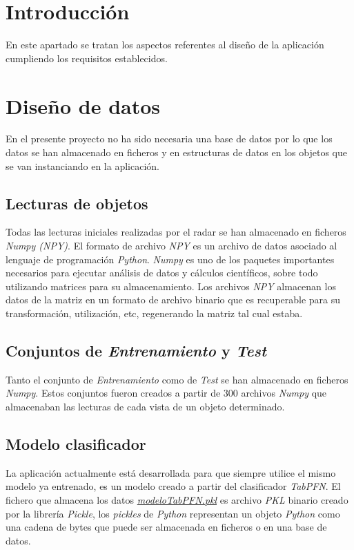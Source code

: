
\section{Introducción}

En este apartado se tratan los aspectos referentes al diseño de la aplicación cumpliendo los requisitos establecidos.

\section{Diseño de datos}

En el presente proyecto no ha sido necesaria una base de datos por lo que los datos se han almacenado en ficheros y en estructuras de datos en los objetos que se van instanciando en la aplicación.

\subsection{Lecturas de objetos}

Todas las lecturas iniciales realizadas por el radar se han almacenado en ficheros \textit{Numpy (NPY)}. El formato de archivo \textit{NPY} es un archivo de datos asociado al lenguaje de programación \textit{Python}. \textit{Numpy} es uno de los paquetes importantes necesarios para ejecutar análisis de datos y cálculos científicos, sobre todo utilizando matrices para su almacenamiento. Los archivos \textit{NPY} almacenan los datos de la matriz en un formato de archivo binario que es recuperable para su transformación, utilización, etc, regenerando la matriz tal cual estaba.

\subsection{Conjuntos de \textit{Entrenamiento} y \textit{Test}}

Tanto el conjunto de \textit{Entrenamiento} como de \textit{Test} se han almacenado en ficheros \textit{Numpy}. Estos conjuntos fueron creados a partir de 300 archivos \textit{Numpy} que almacenaban las lecturas de cada vista de un objeto determinado.

\subsection{Modelo clasificador}

La aplicación actualmente está desarrollada para que siempre utilice el mismo modelo ya entrenado, es un modelo creado a partir del clasificador \textit{TabPFN}. El fichero que almacena los datos \href{https://github.com/mecyc/TFG_RADAR_60GHZ/blob/main/modeloTabPFN.pkl}{\textit{modeloTabPFN.pkl}} es archivo \textit{PKL} binario creado por la librería \textit{Pickle}, los \textit{pickles} de \textit{Python} representan un objeto \textit{Python} como una cadena de bytes que puede ser almacenada en ficheros o en una base de datos.

